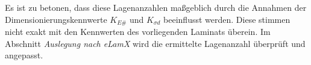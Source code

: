 \noindent Es ist zu betonen, dass diese Lagenanzahlen maßgeblich durch die Annahmen der Dimensionierungskennwerte $ K_{E\#} $ und $ K_{\sigma d} $ beeinflusst werden. Diese stimmen nicht exakt mit den Kennwerten des vorliegenden Laminats überein. Im Abschnitt \textit{Auslegung nach eLamX} wird die ermittelte Lagenanzahl überprüft und angepasst.
